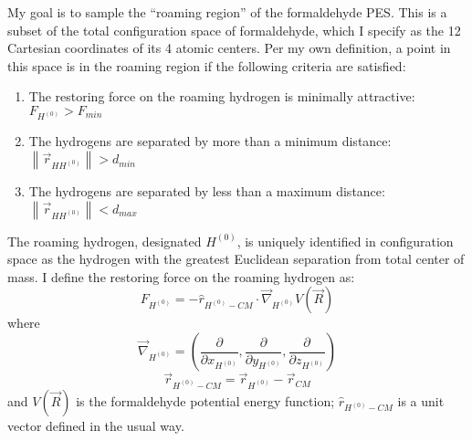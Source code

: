 \documentclass[letterpaper,12pt]{article}
\newcommand{\norm}[1]{\left\lVert#1\right\rVert}
\begin{document}
My goal is to sample the ``roaming region'' of the formaldehyde PES. This is a subset of the total configuration space of formaldehyde, which I specify as the 12 Cartesian coordinates of its 4 atomic centers. Per my own definition, a point in this space is in the roaming region if the following criteria are satisfied:
\begin{enumerate}
\item The restoring force on the roaming hydrogen is minimally attractive: \hfill $F_{H^{(0)}} > F_{min} $
\item The hydrogens are separated by more than a minimum distance: \hfill $\norm{\vec{r}_{HH^{(0)}}} > d_{min}$
\item The hydrogens are separated by less than a maximum distance: \hfill $\norm{\vec{r}_{HH^{(0)}}} < d_{max}$
\end{enumerate}
The roaming hydrogen, designated $H^{(0)}$, is uniquely identified in configuration space as the hydrogen with the greatest Euclidean separation from total center of mass. I define the restoring force on the roaming hydrogen as:
\begin{equation}
F_{H^{(0)}} = - \hat{r}_{H^{(0)}-CM} \cdot \vec{\nabla}_{H^{(0)}} V(\vec{R})
\end{equation}
where
\begin{equation}
\vec{\nabla}_{H^{(0)}} = \left( \frac{\partial}{\partial x_{H^{(0)}}} , \frac{\partial}{\partial y_{H^{(0)}}} , \frac{\partial}{\partial z_{H^{(0)}}}\right)
\end{equation}
\begin{equation}
\vec{r}_{H^{(0)}-CM} = \vec{r}_{H^{(0)}} - \vec{r}_{CM}
\end{equation}
and $V(\vec{R})$ is the formaldehyde potential energy function; $\hat{r}_{H^{(0)}-CM}$ is a unit vector defined in the usual way.
\end{document}
